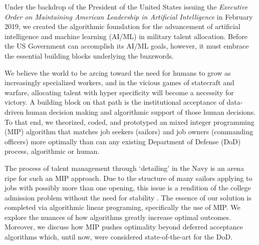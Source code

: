 Under the backdrop of the President of the United States issuing the \textit{Executive Order on Maintaining American Leadership in Artificial Intelligence} in February 2019, we created the algorithmic foundation for the advancement of artificial intelligence and machine learning (AI/ML) in military talent allocation.  Before the US Government can accomplish its AI/ML goals, however, it must embrace the essential building blocks underlying the buzzwords. 

We believe the world to be arcing toward the need for humans to grow as increasingly specialized workers, and in the vicious games of statecraft and warfare, allocating talent with hyper specificity will become a necessity for victory. A building block on that path is the institutional acceptance of data-driven human decision making and algorithmic support of those human decisions. To that end, we theorized, coded, and prototyped an mixed integer programming (MIP) algorithm that matches job seekers (sailors) and job owners (commanding officers) more optimally than can any existing Department of Defense (DoD) process, algorithmic or human. 

The process of talent management through ‘detailing’ in the Navy is an arena ripe for such an MIP approach. Due to the structure of many sailors applying to jobs  with possibly more than one opening, this issue is a rendition of the college admission problem \citep{1962_Gale} without the need for stability \citep{1988_Roth_Sotomayor}. The essence of our solution is completed via algorithmic linear programing, specifically the use of MIP. We explore the nuances of how algorithms greatly increase optimal outcomes. Moreover, we discuss how MIP pushes optimality beyond deferred acceptance algorithms which, until now, were considered state-of-the-art for the DoD. 
